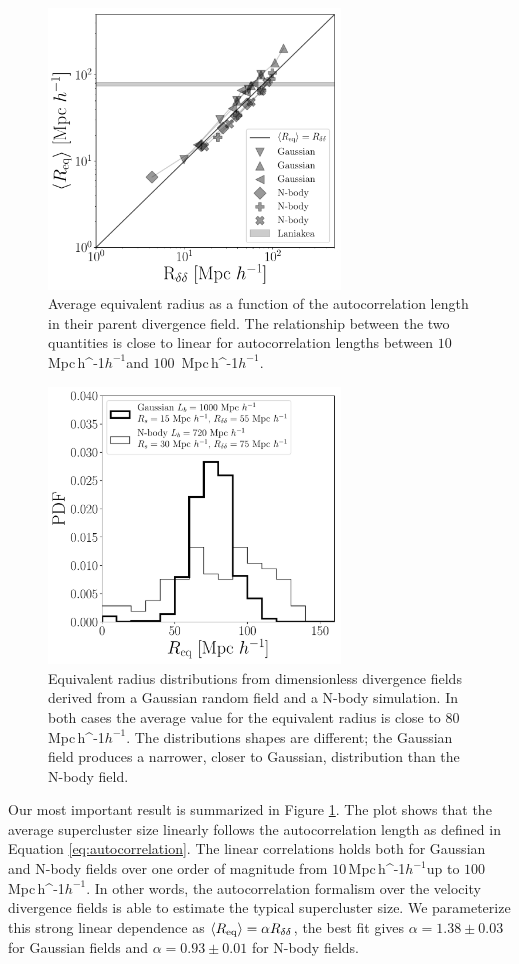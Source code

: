 \documentclass[usenatbib]{mnras}
\newcommand{\Mpch}{\,{\rm Mpc}\,\ifmmode h^{-1}\else $h^{-1}$\fi}
\begin{document}
\begin{figure}
    \centering
    \includegraphics[width=220pt]{summary_watershed.pdf}
    \caption{Average equivalent radius as a function of the autocorrelation length in their parent divergence field.
    The relationship between the two quantities is close to linear for autocorrelation lengths between $10$ \Mpch and $100$ \Mpch. \label{fig:money_plot}}
\end{figure}


 
\begin{figure}
    \centering
    \includegraphics[width=220pt]{sizes_histogram.pdf}
    \caption{Equivalent radius distributions from dimensionless divergence fields derived from a Gaussian random field and a N-body simulation.
    In both cases the average value for the equivalent radius is close to $80$\Mpch. 
    The distributions shapes are different; the Gaussian field produces a narrower, closer to Gaussian, distribution than the N-body field. }  
    \label{fig:Nclusters}
\end{figure}


Our most important result is summarized in Figure \ref{fig:money_plot}.
The plot shows that 
the average supercluster size linearly follows the autocorrelation length as defined in Equation \ref{eq:autocorrelation}.
The linear correlations holds both for Gaussian and N-body fields over one order of magnitude from $10$\Mpch up to $100$\Mpch.
In other words, the autocorrelation formalism over the velocity divergence fields is able to estimate the typical supercluster size.
We parameterize this strong linear dependence  as 
$\langle R_{\rm{eq}}\rangle=\alpha R_{\delta\delta}$, the best fit gives $\alpha=1.38\pm0.03$ for Gaussian fields and $\alpha=0.93\pm 0.01$ for N-body fields.
\end{document}
